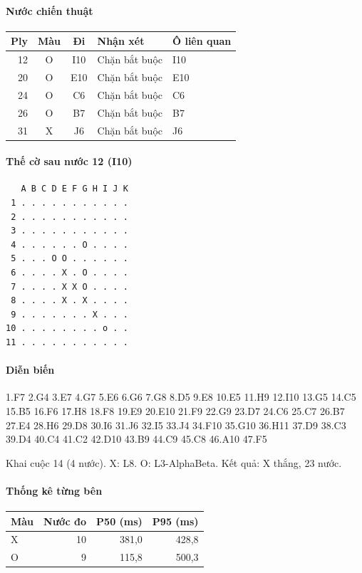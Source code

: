 \paragraph{Nước chiến thuật}
\begin{center}\small
\begin{tabular}{@{}rccll@{}}
\toprule
Ply & Màu & Đi & Nhận xét & Ô liên quan \\
\midrule
12 & O & I10 & Chặn bắt buộc & I10 \\
20 & O & E10 & Chặn bắt buộc & E10 \\
24 & O & C6 & Chặn bắt buộc & C6 \\
26 & O & B7 & Chặn bắt buộc & B7 \\
31 & X & J6 & Chặn bắt buộc & J6 \\
\bottomrule
\end{tabular}
\end{center}
\paragraph{Thế cờ sau nước 12 (I10)}
\begin{verbatim}
   A B C D E F G H I J K
 1 . . . . . . . . . . .
 2 . . . . . . . . . . .
 3 . . . . . . . . . . .
 4 . . . . . . O . . . .
 5 . . . O O . . . . . .
 6 . . . . X . O . . . .
 7 . . . . X X O . . . .
 8 . . . . X . X . . . .
 9 . . . . . . . X . . .
10 . . . . . . . . o . .
11 . . . . . . . . . . .
\end{verbatim}
\paragraph{Diễn biến}
{\footnotesize 1.F7 2.G4 3.E7 4.G7 5.E6 6.G6 7.G8 8.D5 9.E8 10.E5 11.H9 12.I10 13.G5 14.C5 15.B5 16.F6 17.H8 18.F8 19.E9 20.E10 21.F9 22.G9 23.D7 24.C6 25.C7 26.B7 27.E4 28.H6 29.D8 30.I6 31.J6 32.I5 33.J4 34.F10 35.G10 36.H11 37.D9 38.C3 39.D4 40.C4 41.C2 42.D10 43.B9 44.C9 45.C8 46.A10 47.F5\par}
Khai cuộc 14 (4 nước). X: L8. O: L3-AlphaBeta. Kết quả: X thắng, 23 nước.
\paragraph{Thống kê từng bên}
\begin{center}\small
\begin{tabular}{@{}lrrr@{}}
\toprule
Màu & Nước đo & P50 (ms) & P95 (ms) \\
\midrule
X & 10 & 381,0 & 428,8 \\
O & 9 & 115,8 & 500,3 \\
\bottomrule
\end{tabular}
\end{center}
